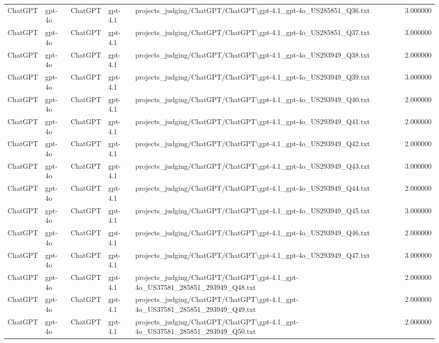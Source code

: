 \begin{table}[H]
\begin{tabular}{lllllr}
ChatGPT & gpt-4o & ChatGPT & gpt-4.1 & projects\_judging/ChatGPT/ChatGPT\textbackslash gpt-4.1\_gpt-4o\_US285851\_Q36.txt & 3.000000 \\
ChatGPT & gpt-4o & ChatGPT & gpt-4.1 & projects\_judging/ChatGPT/ChatGPT\textbackslash gpt-4.1\_gpt-4o\_US285851\_Q37.txt & 3.000000 \\
ChatGPT & gpt-4o & ChatGPT & gpt-4.1 & projects\_judging/ChatGPT/ChatGPT\textbackslash gpt-4.1\_gpt-4o\_US293949\_Q38.txt & 2.000000 \\
ChatGPT & gpt-4o & ChatGPT & gpt-4.1 & projects\_judging/ChatGPT/ChatGPT\textbackslash gpt-4.1\_gpt-4o\_US293949\_Q39.txt & 3.000000 \\
ChatGPT & gpt-4o & ChatGPT & gpt-4.1 & projects\_judging/ChatGPT/ChatGPT\textbackslash gpt-4.1\_gpt-4o\_US293949\_Q40.txt & 2.000000 \\
ChatGPT & gpt-4o & ChatGPT & gpt-4.1 & projects\_judging/ChatGPT/ChatGPT\textbackslash gpt-4.1\_gpt-4o\_US293949\_Q41.txt & 2.000000 \\
ChatGPT & gpt-4o & ChatGPT & gpt-4.1 & projects\_judging/ChatGPT/ChatGPT\textbackslash gpt-4.1\_gpt-4o\_US293949\_Q42.txt & 2.000000 \\
ChatGPT & gpt-4o & ChatGPT & gpt-4.1 & projects\_judging/ChatGPT/ChatGPT\textbackslash gpt-4.1\_gpt-4o\_US293949\_Q43.txt & 3.000000 \\
ChatGPT & gpt-4o & ChatGPT & gpt-4.1 & projects\_judging/ChatGPT/ChatGPT\textbackslash gpt-4.1\_gpt-4o\_US293949\_Q44.txt & 2.000000 \\
ChatGPT & gpt-4o & ChatGPT & gpt-4.1 & projects\_judging/ChatGPT/ChatGPT\textbackslash gpt-4.1\_gpt-4o\_US293949\_Q45.txt & 3.000000 \\
ChatGPT & gpt-4o & ChatGPT & gpt-4.1 & projects\_judging/ChatGPT/ChatGPT\textbackslash gpt-4.1\_gpt-4o\_US293949\_Q46.txt & 2.000000 \\
ChatGPT & gpt-4o & ChatGPT & gpt-4.1 & projects\_judging/ChatGPT/ChatGPT\textbackslash gpt-4.1\_gpt-4o\_US293949\_Q47.txt & 3.000000 \\
ChatGPT & gpt-4o & ChatGPT & gpt-4.1 & projects\_judging/ChatGPT/ChatGPT\textbackslash gpt-4.1\_gpt-4o\_US37581\_285851\_293949\_Q48.txt & 2.000000 \\
ChatGPT & gpt-4o & ChatGPT & gpt-4.1 & projects\_judging/ChatGPT/ChatGPT\textbackslash gpt-4.1\_gpt-4o\_US37581\_285851\_293949\_Q49.txt & 2.000000 \\
ChatGPT & gpt-4o & ChatGPT & gpt-4.1 & projects\_judging/ChatGPT/ChatGPT\textbackslash gpt-4.1\_gpt-4o\_US37581\_285851\_293949\_Q50.txt & 2.000000 \\

\end{tabular}
\end{table}
